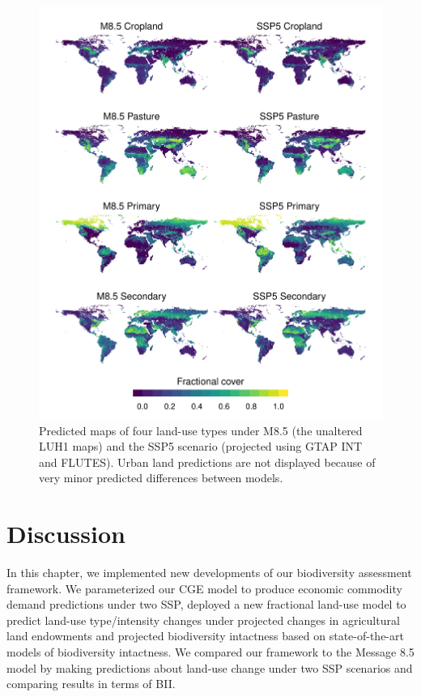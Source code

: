 \documentclass[titlesmallcaps,copyrightpage]{uomthesis}\usepackage[]{graphicx}\usepackage[]{color}
\begin{document}
\begin{figure}[htb]
  \centering
    \includegraphics{chapters/figures/chapter4/fig_landusemaps.pdf}
    \caption{Predicted maps of four land-use types under M8.5 (the unaltered LUH1 maps) and the SSP5 scenario (projected using GTAP INT and FLUTES). Urban land predictions are not displayed because of very minor predicted differences between models.}
    \label{ch4:fig_landusemaps}
\end{figure}

\section{Discussion}
In this chapter, we implemented new developments of our biodiversity assessment framework. We parameterized our CGE model to produce economic commodity demand predictions under two SSP, deployed a new fractional land-use model to predict land-use type/intensity changes under projected changes in agricultural land endowments and projected biodiversity intactness based on state-of-the-art models of biodiversity intactness. We compared our framework to the Message 8.5 model by making predictions about land-use change under two SSP scenarios and comparing results in terms of BII.
\end{document}
